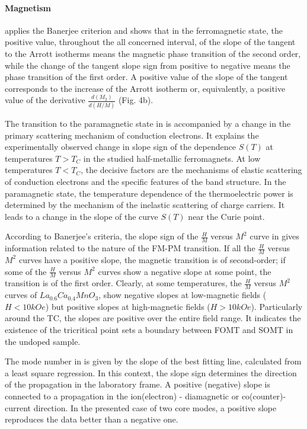 \documentclass[11pt]{book}
\begin{document}
\paragraph{Magnetism}

\cite{trukhanov2011peculiarities} applies the Banerjee criterion and shows that in the ferromagnetic state, the positive value,
throughout the all concerned interval, of the slope of the tangent
to the Arrott isotherms means the magnetic phase transition of the
second order, while the change of the tangent slope sign from positive
to negative means the phase transition of the first order. A positive
value of the slope of the tangent corresponds to the increase of the
Arrott isotherm or, equivalently, a positive value of the derivative
$\frac{d\left(M_{2}\right)}{d\left(H/M\right)}$ (Fig. 4b).

The transition to the paramagnetic state in \cite{kourov2015specific}
is accompanied by a change in the primary scattering mechanism of
conduction electrons. It explains the experimentally observed change
in slope sign of the dependence $S\left(T\right)$ at temperatures
$T>T_{C}$ in the studied half-metallic ferromagnets. At low temperatures
$T<T_{C}$, the decisive factors are the mechanisms of elastic scattering
of conduction electrons and the specific features of the band structure.
In the paramagnetic state, the temperature dependence of the thermoelectric
power is determined by the mechanism of the inelastic scattering of
charge carriers. It leads to a change in the slope of the curve $S\left(T\right)$
near the Curie point.

According to Banerjee's criteria, the slope sign of the $\frac{H}{M}$
versus $M^{2}$ curve in \cite{ho2015magnetic} gives information
related to the nature of the FM-PM transition. If all the $\frac{H}{M}$
versus $M^{2}$ curves have a positive slope, the magnetic transition
is of second-order; if some of the $\frac{H}{M}$ versus $M^{2}$
curves show a negative slope at some point, the transition is of the
first order. Clearly, at some temperatures, the $\frac{H}{M}$ versus
$M^{2}$ curves of $La_{0.6}Ca_{0.4}MnO_{3}$, show negative slopes
at low-magnetic fields ($H<10kOe$) but positive slopes at high-magnetic
fields ($H>10kOe$). Particularly around the TC, the slopes are positive
over the entire field range. It indicates the existence of the tricritical
point sets a boundary between FOMT and SOMT in the undoped sample.

The mode number in \cite{mink2016toroidal} is given by the slope
of the best fitting line, calculated from a least square regression.
In this context, the slope sign determines the direction of the propagation
in the laboratory frame. A positive (negative) slope is connected
to a propagation in the ion(electron) - diamagnetic or co(counter)-current
direction. In the presented case of two core modes, a positive slope
reproduces the data better than a negative one.
\end{document}

